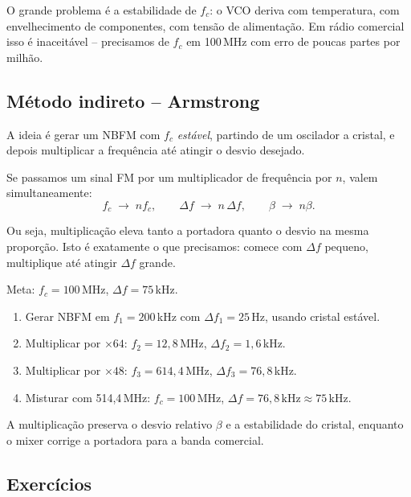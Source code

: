 \documentclass[11pt,a4paper]{article}
\begin{document}
O grande problema é a estabilidade de $f_c$: o VCO deriva com temperatura, com envelhecimento de componentes, com tensão de alimentação. Em rádio comercial isso é inaceitável -- precisamos de $f_c$ em 100\,MHz com erro de poucas partes por milhão.

\subsection{Método indireto -- Armstrong}

A ideia é gerar um NBFM com $f_c$ \emph{estável}, partindo de um oscilador a cristal, e depois multiplicar a frequência até atingir o desvio desejado.

\begin{quadro}
Se passamos um sinal FM por um multiplicador de frequência por $n$, valem simultaneamente:
\[
  f_c \;\to\; n f_c, \qquad
  \Delta f \;\to\; n\,\Delta f, \qquad
  \beta \;\to\; n\beta.
\]

Ou seja, multiplicação eleva tanto a portadora quanto o desvio na mesma proporção. Isto é exatamente o que precisamos: comece com $\Delta f$ pequeno, multiplique até atingir $\Delta f$ grande.
\end{quadro}

\begin{exemplo}
Meta: $f_c=100$\,MHz, $\Delta f = 75$\,kHz.

\begin{enumerate}
  \item Gerar NBFM em $f_1 = 200$\,kHz com $\Delta f_1 = 25$\,Hz, usando cristal estável.
  \item Multiplicar por $\times 64$: $f_2 = 12{,}8$\,MHz, $\Delta f_2 = 1{,}6$\,kHz.
  \item Multiplicar por $\times 48$: $f_3 = 614{,}4$\,MHz, $\Delta f_3 = 76{,}8$\,kHz.
  \item Misturar com 514,4\,MHz: $f_c = 100$\,MHz, $\Delta f = 76{,}8\,\mathrm{kHz} \approx 75$\,kHz.
\end{enumerate}

A multiplicação preserva o desvio relativo $\beta$ e a estabilidade do cristal, enquanto o mixer corrige a portadora para a banda comercial.
\end{exemplo}

\subsection{Exercícios}
\end{document}
